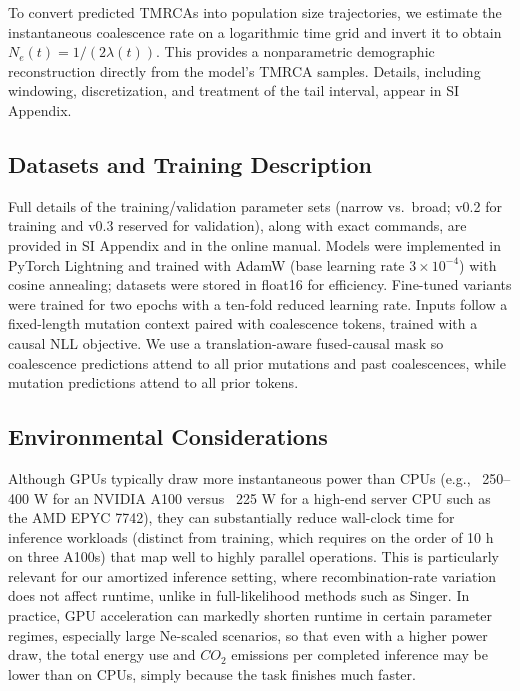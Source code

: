 \documentclass[9pt,twocolumn,twoside]{pnas-new}
\begin{document}
{To convert predicted TMRCAs into population size trajectories, 
we estimate the instantaneous coalescence rate on a logarithmic time grid 
and invert it to obtain $N_e(t) = 1 / (2\lambda(t))$. 
This provides a nonparametric demographic reconstruction directly from the model's TMRCA samples. 
Details, including windowing, discretization, and treatment of the tail interval, 
appear in SI Appendix.


\subsection*{Datasets and Training Description}
\label{datasets}

Full details of the training/validation parameter sets (narrow vs.\ broad; \stdpopsim v0.2 for training and v0.3 reserved for validation), along with exact commands, are provided in SI Appendix and in the online manual. 
Models were implemented in PyTorch Lightning and trained with AdamW (base learning rate $3\times10^{-4}$) with cosine annealing; datasets were stored in float16 for efficiency. 
Fine-tuned variants were trained for two epochs with a ten-fold reduced learning rate. 
Inputs follow a fixed-length mutation context paired with coalescence tokens, trained with a causal NLL objective. 
We use a translation-aware fused-causal mask so coalescence predictions attend to all prior mutations and past coalescences, while mutation predictions attend to all prior tokens.


\subsection*{Environmental Considerations}
Although GPUs typically draw more instantaneous power than CPUs 
(e.g., ~250–400 W for an NVIDIA A100 versus ~225 W for a high-end server CPU such as the AMD EPYC 7742),
they can substantially reduce wall-clock time for inference workloads 
(distinct from training, which requires on the order of 10 h on three A100s) 
that map well to highly parallel operations. 
This is particularly relevant for our amortized inference setting, 
where recombination-rate variation does not affect runtime, 
unlike in full-likelihood methods such as Singer. 
In practice, GPU acceleration can markedly shorten runtime in certain parameter regimes, especially large Ne-scaled scenarios, so that even with a higher power draw, 
the total energy use and $CO_{2}$ emissions per completed inference may be lower than on CPUs,
simply because the task finishes much faster.

}
\end{document}
